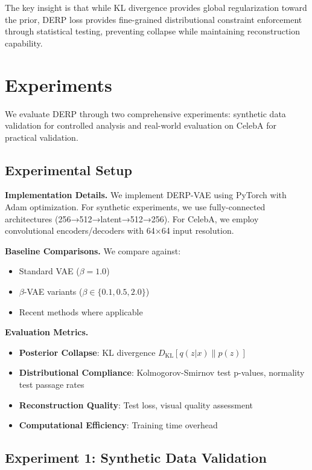 \documentclass{article}
\begin{document}
The key insight is that while KL divergence provides global regularization toward the prior, DERP loss provides fine-grained distributional constraint enforcement through statistical testing, preventing collapse while maintaining reconstruction capability.

\section{Experiments}

We evaluate DERP through two comprehensive experiments: synthetic data validation for controlled analysis and real-world evaluation on CelebA for practical validation.

\subsection{Experimental Setup}

\textbf{Implementation Details.} We implement DERP-VAE using PyTorch with Adam optimization. For synthetic experiments, we use fully-connected architectures (256→512→latent→512→256). For CelebA, we employ convolutional encoders/decoders with 64×64 input resolution.

\textbf{Baseline Comparisons.} We compare against:
\begin{itemize}
\item Standard VAE ($\beta=1.0$)
\item $\beta$-VAE variants ($\beta \in \{0.1, 0.5, 2.0\}$)
\item Recent methods where applicable
\end{itemize}

\textbf{Evaluation Metrics.}
\begin{itemize}
\item \textbf{Posterior Collapse}: KL divergence $D_{\text{KL}}[q(z|x) \| p(z)]$
\item \textbf{Distributional Compliance}: Kolmogorov-Smirnov test p-values, normality test passage rates
\item \textbf{Reconstruction Quality}: Test loss, visual quality assessment
\item \textbf{Computational Efficiency}: Training time overhead
\end{itemize}

\subsection{Experiment 1: Synthetic Data Validation}
\end{document}
